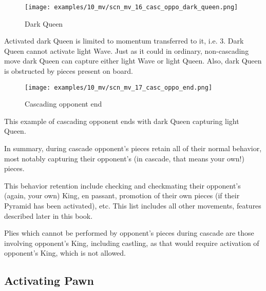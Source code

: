 \vspace*{0.315\textheight}
\noindent
\begin{wrapfigure}[13]{r}{0.5625\textwidth}
\centering
\texttt{[image: examples/10\_mv/scn\_mv\_16\_casc\_oppo\_dark\_queen.png]}
\caption{Dark Queen}
\label{fig:scn_mv_16_casc_oppo_dark_queen}
\end{wrapfigure}
Activated dark Queen is limited to momentum transferred to it, i.e. 3. Dark Queen
cannot activate light Wave. Just as it could in ordinary, non-cascading move dark
Queen can capture either light Wave or light Queen. Also, dark Queen is obstructed
by pieces present on board.

\clearpage %

\noindent
\begin{wrapfigure}[4]{l}{0.5625\textwidth}
\centering
\texttt{[image: examples/10\_mv/scn\_mv\_17\_casc\_oppo\_end.png]}
\caption{Cascading opponent end}
\label{fig:scn_mv_17_casc_oppo_end}
\end{wrapfigure}
This example of cascading opponent ends with dark Queen capturing light Queen.

\vspace*{0.355\textheight}
In summary, during cascade opponent's pieces retain all of their normal behavior,
most notably capturing their opponent's (in cascade, that means your own!) pieces.

This behavior retention include checking and checkmating their opponent's (again,
your own) King, en passant, promotion of their own pieces (if their Pyramid has
been activated), etc. This list includes all other movements, features described
later in this book.

Plies which cannot be performed by opponent's pieces during cascade are those
involving opponent's King, including castling, as that would require activation
of opponent's King, which is not allowed.

\clearpage %

\subsection*{Activating Pawn}

